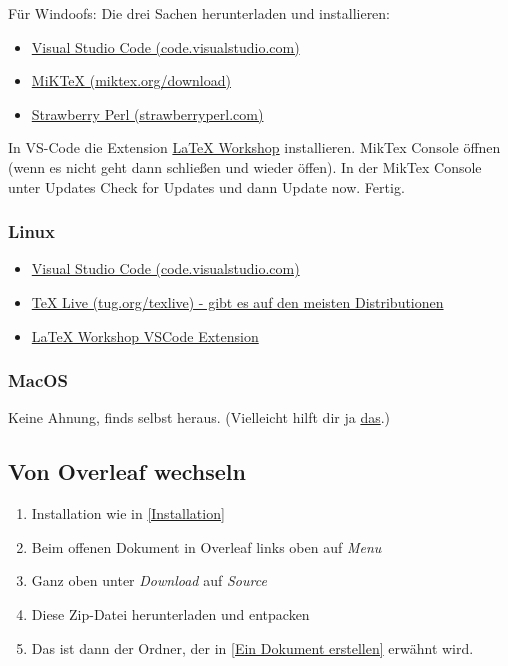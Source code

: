 \documentclass{article}
\begin{document}
Für Windoofs: Die drei Sachen herunterladen und installieren: 
\begin{itemize}
    \item \href{https://code.visualstudio.com/}{Visual Studio Code (code.visualstudio.com)}
    \item \href{https://miktex.org/download}{MiKTeX (miktex.org/download)}
    \item \href{https://strawberryperl.com/}{Strawberry Perl (strawberryperl.com)}
\end{itemize}
In VS-Code die Extension \href{https://open-vsx.org/extension/James-Yu/latex-workshop}{LaTeX Workshop} installieren. MikTex Console öffnen (wenn es nicht geht dann schließen und wieder öffen).
In der MikTex Console unter Updates Check for Updates und dann Update now. Fertig. 
\subsubsection{Linux}
\begin{itemize}
    \item \href{https://code.visualstudio.com/}{Visual Studio Code (code.visualstudio.com)}
    \item \href{https://tug.org/texlive}{TeX Live (tug.org/texlive) - gibt es auf den meisten Distributionen}
    \item \href{https://open-vsx.org/extension/James-Yu/latex-workshop}{LaTeX Workshop VSCode Extension}
\end{itemize}

\subsubsection{MacOS}
Keine Ahnung, finds selbst heraus.
(Vielleicht hilft dir ja \href{https://tex.stackexchange.com/questions/220/i-want-to-start-using-latex-on-mac-os-x-where-do-i-start}{das}.)

\subsection{Von Overleaf wechseln}

\begin{enumerate}
    \item Installation wie in \autoref{Installation}
    \item Beim offenen Dokument in Overleaf links oben auf \textit{Menu}
    \item Ganz oben unter \textit{Download} auf \textit{Source}
    \item Diese Zip-Datei herunterladen und entpacken 
    \item Das ist dann der Ordner, der in \autoref{Ein Dokument erstellen} erwähnt wird.
\end{enumerate}
\end{document}
